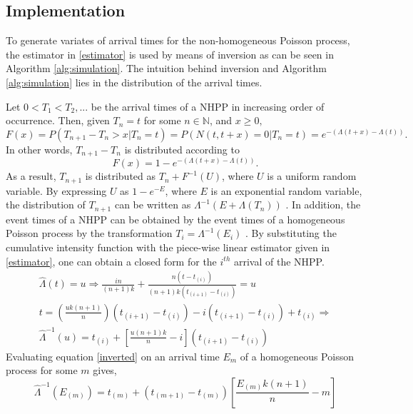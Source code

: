 \documentclass[12pt]{article}
\theoremstyle{definition}
\begin{document}
\subsection{Implementation}
To generate variates of arrival times for the non-homogeneous Poisson process, the estimator in \eqref{estimator} is used by means of inversion as can be seen in Algorithm \ref{alg:simulation}. The intuition behind inversion and Algorithm \ref{alg:simulation} lies in the distribution of the arrival times. 

Let $0<T_1<T_2,...$ be the arrival times of a NHPP in increasing order of occurrence. Then, given $T_n=t$ for some $n\in\mathbb{N}$, and $x\geq 0,$ $$F(x)=P(T_{n+1}-T_n>x|T_n=t)=P(N(t, t+x)=0|T_n=t)=e^{-(\Lambda(t+x)-\Lambda(t))}.$$ In other words, $T_{n+1}-T_n$ is distributed according to $$F(x)=1-e^{-(\Lambda(t+x)-\Lambda(t))}.$$ As a result, $T_{n+1}$ is distributed as $T_n + F^{-1}(U)$, where $U$ is a uniform random variable. By expressing $U$ as $1-e^{-E}$, where $E$ is an exponential random variable, the distribution of $T_{n+1}$ can be written as $\Lambda^{-1}(E+\Lambda(T_n))$ \cite{classicsimulation}. In addition, the event times of a NHPP can be obtained by the event times of a homogeneous Poisson process by the transformation $T_i=\Lambda^{-1}(E_i)$ \cite{cinclar}. By substituting the cumulative intensity function with the piece-wise linear estimator given in \eqref{estimator}, one can obtain a closed form for the $i^{th}$ arrival of the NHPP. 
\begin{equation}\label{inverted}
\begin{aligned}
    \hat{\Lambda}(t) = u\Rightarrow 
    \frac{in}{(n+1)k} + \frac{n(t-t_{(i)})}{(n+1)k(t_{(i+1)}-t_{(i)})}=u\\
    t =\left ( \frac{uk(n+1)}{n}\right )(t_{(i+1)}-t_{(i)}) -i (t_{(i+1)}-t_{(i)}) + t_{(i)} \Rightarrow\\
    \hat{\Lambda}^{-1}(u) = t_{(i)} + \left [\frac{u(n+1)k}{n} - i \right ](t_{(i+1)}-t_{(i)}) 
\end{aligned}
\end{equation}
Evaluating equation \eqref{inverted} on an arrival time $E_m$ of a homogeneous Poisson process for some $m$ gives, 
\begin{equation}
    \hat{\Lambda}^{-1}(E_{(m)}) =  t_{(m)} + (t_{(m+1)}-t_{(m)})\left [\frac{E_{(m)}k(n+1)}{n}-m\right ]
\end{equation}
\end{document}
